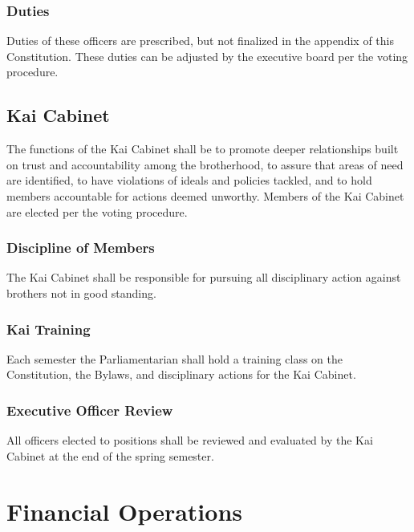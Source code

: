 \subsection{Duties}
\label{sec:duties}

Duties of these officers are prescribed, but not finalized in the appendix of
this Constitution.
These duties can be adjusted by the executive board per the voting procedure.

\section{Kai Cabinet}
\label{sec:kai-cabinet}

The functions of the Kai Cabinet shall be to promote deeper relationships built
on trust and accountability among the brotherhood, to assure that areas of need
are identified, to have violations of ideals and policies tackled, and to hold
members accountable for actions deemed unworthy.
Members of the Kai Cabinet are elected per the voting procedure.

\subsection{Discipline of Members}
\label{sec:discipline-of-members}

The Kai Cabinet shall be responsible for pursuing all disciplinary action
against brothers not in good standing.

\subsection{Kai Training}
\label{sec:kai-training}

Each semester the Parliamentarian shall hold a training class on the
Constitution, the Bylaws, and disciplinary actions for the Kai Cabinet.

\subsection{Executive Officer Review}
\label{sec:executive-officer-review}

All officers elected to positions shall be reviewed and evaluated by the Kai
Cabinet at the end of the spring semester.

\chapter{Financial Operations}
\label{cha:financial-operations}

